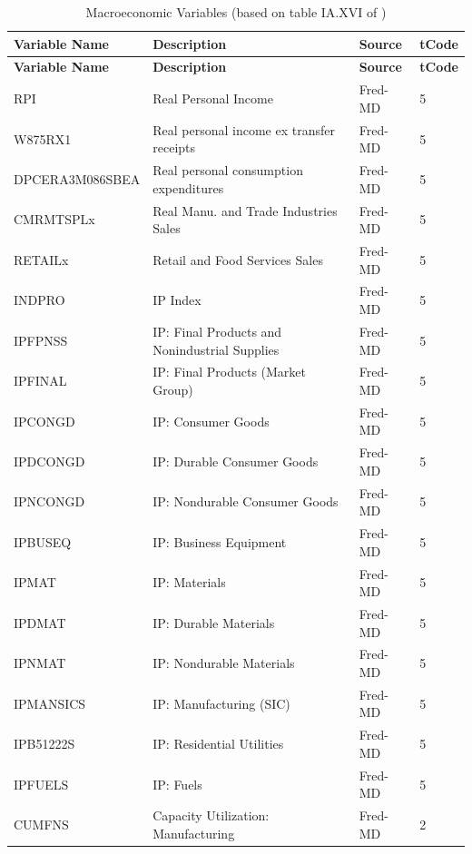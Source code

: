 \documentclass[11pt]{article}
\theoremstyle{plain}
\theoremstyle{definition}
\theoremstyle{remark}
\numberwithin{equation}{section}
\begin{document}
\small{
\begin{longtable}{|l|l|l|l|}
\caption{Macroeconomic Variables (based on table IA.XVI of \citet{chen2020internet})}
\\
\hline
\textbf{Variable Name} & \textbf{Description} & \textbf{Source} & \textbf{tCode} \\ \hline
\endfirsthead

\hline
\textbf{Variable Name} & \textbf{Description} & \textbf{Source} & \textbf{tCode} \\ \hline
\endhead

\hline
\endfoot

\hline
\endlastfoot

RPI & Real Personal Income & Fred-MD & 5 \\ \hline
W875RX1 & Real personal income ex transfer receipts & Fred-MD & 5 \\ \hline
DPCERA3M086SBEA & Real personal consumption expenditures & Fred-MD & 5 \\ \hline
CMRMTSPLx & Real Manu. and Trade Industries Sales & Fred-MD & 5 \\ \hline
RETAILx & Retail and Food Services Sales & Fred-MD & 5 \\ \hline
INDPRO & IP Index & Fred-MD & 5 \\ \hline
IPFPNSS & IP: Final Products and Nonindustrial Supplies & Fred-MD & 5 \\ \hline
IPFINAL & IP: Final Products (Market Group) & Fred-MD & 5 \\ \hline
IPCONGD & IP: Consumer Goods & Fred-MD & 5 \\ \hline
IPDCONGD & IP: Durable Consumer Goods & Fred-MD & 5 \\ \hline
IPNCONGD & IP: Nondurable Consumer Goods & Fred-MD & 5 \\ \hline
IPBUSEQ & IP: Business Equipment & Fred-MD & 5 \\ \hline
IPMAT & IP: Materials & Fred-MD & 5 \\ \hline
IPDMAT & IP: Durable Materials & Fred-MD & 5 \\ \hline
IPNMAT & IP: Nondurable Materials & Fred-MD & 5 \\ \hline
IPMANSICS & IP: Manufacturing (SIC) & Fred-MD & 5 \\ \hline
IPB51222S & IP: Residential Utilities & Fred-MD & 5 \\ \hline
IPFUELS & IP: Fuels & Fred-MD & 5 \\ \hline
CUMFNS & Capacity Utilization: Manufacturing & Fred-MD & 2 \\ \hline

\end{longtable}}
\end{document}

